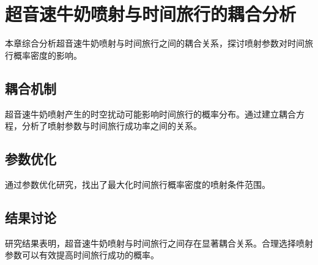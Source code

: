 \chapter{超音速牛奶喷射与时间旅行的耦合分析}

本章综合分析超音速牛奶喷射与时间旅行之间的耦合关系，探讨喷射参数对时间旅行概率密度的影响。

\section{耦合机制}

超音速牛奶喷射产生的时空扰动可能影响时间旅行的概率分布。通过建立耦合方程，分析了喷射参数与时间旅行成功率之间的关系。

\section{参数优化}

通过参数优化研究，找出了最大化时间旅行概率密度的喷射条件范围。

\section{结果讨论}

研究结果表明，超音速牛奶喷射与时间旅行之间存在显著耦合关系。合理选择喷射参数可以有效提高时间旅行成功的概率。
